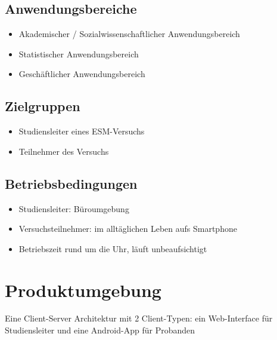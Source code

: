 \documentclass[a4paper]{scrreprt}
\begin{document}
        \section{Anwendungsbereiche}
            \begin{itemize}
                \item Akademischer / Sozialwissenschaftlicher Anwendungsbereich
                \item Statistischer Anwendungsbereich
                \item Geschäftlicher Anwendungsbereich
            \end{itemize}

        \section{Zielgruppen}
            \begin{itemize}
                \item \gls{Studiensleiter} eines ESM-Versuchs
                \item Teilnehmer des Versuchs
            \end{itemize}

        \section{Betriebsbedingungen}
            \begin{itemize}
                \item \gls{Studiensleiter}: Büroumgebung
                \item Versuchsteilnehmer: im alltäglichen Leben aufs Smartphone
                \item Betriebszeit rund um die Uhr, läuft unbeaufsichtigt
            \end{itemize}

    \chapter{Produktumgebung}
        Eine Client-Server Architektur mit 2 Client-Typen: ein \gls{Web-Interface} für \gls{Studiensleiter} und eine \gls{Android-App} für \gls{Proband}en
\end{document}
